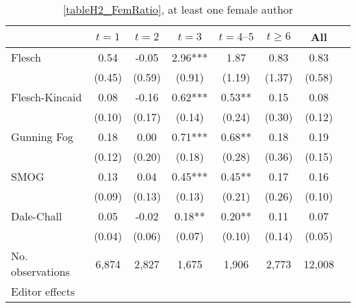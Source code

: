 \begin{table}
    \footnotesize
    \centering
    \begin{threeparttable}
        \caption{\autoref{tableH2_FemRatio}, at least one female author}
        \label{tableH2_Fem1}
        \begin{tabular}{p{3cm}S@{}S@{}S@{}S@{}S@{}S@{}S@{}}
            \toprule
            &{\(t=1\)}&{\(t=2\)}&{\(t=3\)}&{\(t=4\text{--}5\)}&{\(t\ge6\)}&{All}\\
            \midrule
            Flesch                        &        0.54   &       -0.05   &        2.96***&        1.87   &        0.83   &        0.83   \\
                                          &      (0.45)   &      (0.59)   &      (0.91)   &      (1.19)   &      (1.37)   &      (0.58)   \\
            Flesch-Kincaid                &        0.08   &       -0.16   &        0.62***&        0.53** &        0.15   &        0.08   \\
                                          &      (0.10)   &      (0.17)   &      (0.14)   &      (0.24)   &      (0.30)   &      (0.12)   \\
            Gunning Fog                   &        0.18   &        0.00   &        0.71***&        0.68** &        0.18   &        0.19   \\
                                          &      (0.12)   &      (0.20)   &      (0.18)   &      (0.28)   &      (0.36)   &      (0.15)   \\
            SMOG                          &        0.13   &        0.04   &        0.45***&        0.45** &        0.17   &        0.16   \\
                                          &      (0.09)   &      (0.13)   &      (0.13)   &      (0.21)   &      (0.26)   &      (0.10)   \\
            Dale-Chall                    &        0.05   &       -0.02   &        0.18** &        0.20** &        0.11   &        0.07   \\
                                          &      (0.04)   &      (0.06)   &      (0.07)   &      (0.10)   &      (0.14)   &      (0.05)   \\
            \midrule
            No. observations              &       6,874   &       2,827   &       1,675   &       1,906   &       2,773   &      12,008   \\
            \midrule
            Editor effects       &           {}   &           {}   &           {}   &           {}   &           {}   &           {}   \\

\end{tabular}
\end{threeparttable}
\end{table}
